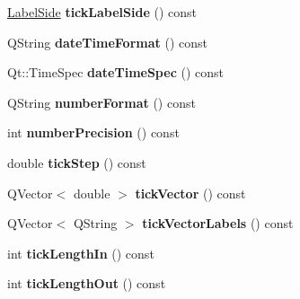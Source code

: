 \begin{DoxyCompactItemize}
\item 
\hypertarget{classQCPAxis_a0a33835705406506b02a445b1ba32357}{}\hyperlink{classQCPAxis_a24b13374b9b8f75f47eed2ea78c37db9}{Label\+Side} {\bfseries tick\+Label\+Side} () const \label{classQCPAxis_a0a33835705406506b02a445b1ba32357}

\item 
\hypertarget{classQCPAxis_a132b54ae184a12ed24c9af24f53dc70b}{}Q\+String {\bfseries date\+Time\+Format} () const \label{classQCPAxis_a132b54ae184a12ed24c9af24f53dc70b}

\item 
\hypertarget{classQCPAxis_afdd04c56ed29a9d948f840fc76f0d383}{}Qt\+::\+Time\+Spec {\bfseries date\+Time\+Spec} () const \label{classQCPAxis_afdd04c56ed29a9d948f840fc76f0d383}

\item 
\hypertarget{classQCPAxis_ae6729b40845b29ffa5a440aa53cec215}{}Q\+String {\bfseries number\+Format} () const \label{classQCPAxis_ae6729b40845b29ffa5a440aa53cec215}

\item 
\hypertarget{classQCPAxis_a91cb2825060ac79a889296377fe0c7c1}{}int {\bfseries number\+Precision} () const \label{classQCPAxis_a91cb2825060ac79a889296377fe0c7c1}

\item 
\hypertarget{classQCPAxis_a0e6120d24266544441ab691f316a1b03}{}double {\bfseries tick\+Step} () const \label{classQCPAxis_a0e6120d24266544441ab691f316a1b03}

\item 
\hypertarget{classQCPAxis_a5b00b14f480f926df976cc6c52309e78}{}Q\+Vector$<$ double $>$ {\bfseries tick\+Vector} () const \label{classQCPAxis_a5b00b14f480f926df976cc6c52309e78}

\item 
\hypertarget{classQCPAxis_a64e6fa81f943ad33dcaf3fa606687b93}{}Q\+Vector$<$ Q\+String $>$ {\bfseries tick\+Vector\+Labels} () const \label{classQCPAxis_a64e6fa81f943ad33dcaf3fa606687b93}

\item 
\hypertarget{classQCPAxis_a59265d65c5034695ac2578bccbbb0f4a}{}int {\bfseries tick\+Length\+In} () const \label{classQCPAxis_a59265d65c5034695ac2578bccbbb0f4a}

\item 
\hypertarget{classQCPAxis_ae1b3d7473f50ba8544b2027c1cdc80f2}{}int {\bfseries tick\+Length\+Out} () const \label{classQCPAxis_ae1b3d7473f50ba8544b2027c1cdc80f2}


\end{DoxyCompactItemize}
